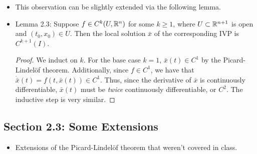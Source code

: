 \documentclass[../notes.tex]{subfiles}
\begin{document}
\begin{itemize}
\begin{itemize}
    \end{itemize}
    \item This observation can be slightly extended via the following lemma.
    \item Lemma 2.3: Suppose $f\in C^k(U,\mathbb{R}^n)$ for some $k\geq 1$, where $U\subset\mathbb{R}^{n+1}$ is open and $(t_0,x_0)\in U$. Then the local solution $\bar{x}$ of the corresponding IVP is $C^{k+1}(I)$.
    \begin{proof}
        We induct on $k$. For the base case $k=1$, $\bar{x}(t)\in C^1$ by the Picard-Lindel\"{o}f theorem. Additionally, since $f\in C^1$, we have that $\dot{\bar{x}}(t)=f(t,\bar{x}(t))\in C^1$. Thus, since the derivative of $\bar{x}$ is continuously differentiable, $\bar{x}(t)$ must be \emph{twice} continuously differentiable, or $C^2$. The inductive step is very similar.
    \end{proof}
\end{itemize}


\subsection*{Section 2.3: Some Extensions}
\begin{itemize}
    \item Extensions of the Picard-Lindel\"{o}f theorem that weren't covered in class.
\end{itemize}
\end{document}
